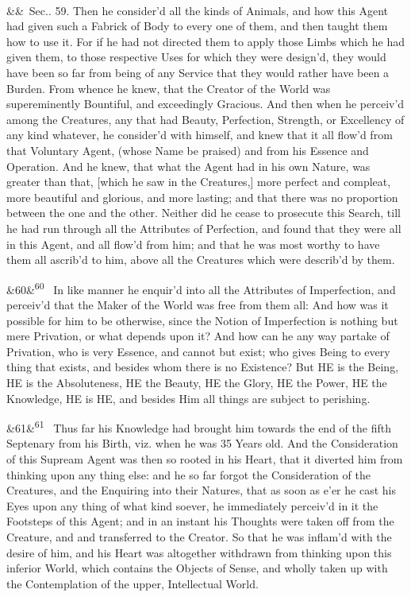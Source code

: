 \documentclass[12pt]{article}
\newcommand{\para}[1][]{\par\noindent\ifx&#1&\else\textsuperscript{\footnotesize #1}~\fi}
\begin{document}
\para Sec.. 59. Then he consider'd all the kinds of Animals, and how this Agent had given such a Fabrick of Body to every one of them, and then taught them how to use it. For if he had not directed them to apply those Limbs which he had given them, to those respective Uses for which they were design'd, they would have been so far from being of any Service that they would rather have been a Burden. From whence he knew, that the Creator of the World was supereminently Bountiful, and exceedingly Gracious. And then when he perceiv'd among the Creatures, any that had Beauty, Perfection, Strength, or Excellency of any kind whatever, he consider'd with himself, and knew that it all flow'd from that Voluntary Agent, (whose Name be praised) and from his Essence and Operation. And he knew, that what the Agent had in his own Nature, was greater than that, [which he saw in the Creatures,] more perfect and compleat, more beautiful and glorious, and more lasting; and that there was no proportion between the one and the other. Neither did he cease to prosecute this Search, till he had run through all the Attributes of Perfection, and found that they were all in this Agent, and all flow'd from him; and that he was most worthy to have them all ascrib'd to him, above all the Creatures which were describ'd by them.

\para[60] In like manner he enquir'd into all the Attributes of Imperfection, and perceiv'd that the Maker of the World was free from them all: And how was it possible for him to be otherwise, since the Notion of Imperfection is nothing but mere Privation, or what depends upon it? And how can he any way partake of Privation, who is very Essence, and cannot but exist; who gives Being to every thing that exists, and besides whom there is no Existence? But HE is the Being, HE is the Absoluteness, HE the Beauty, HE the Glory, HE the Power, HE the Knowledge, HE is HE, and besides Him all things are subject to perishing.

\para[61] Thus far his Knowledge had brought him towards the end of the fifth Septenary from his Birth, viz. when he was 35 Years old. And the Consideration of this Supream Agent was then so rooted in his Heart, that it diverted him from thinking upon any thing else: and he so far forgot the Consideration of the Creatures, and the Enquiring into their Natures, that as soon as e'er he cast his Eyes upon any thing of what kind soever, he immediately perceiv'd in it the Footsteps of this Agent; and in an instant his Thoughts were taken off from the Creature, and and transferred to the Creator. So that he was inflam'd with the desire of him, and his Heart was altogether withdrawn from thinking upon this inferior World, which contains the Objects of Sense, and wholly taken up with the Contemplation of the upper, Intellectual World.
\end{document}
